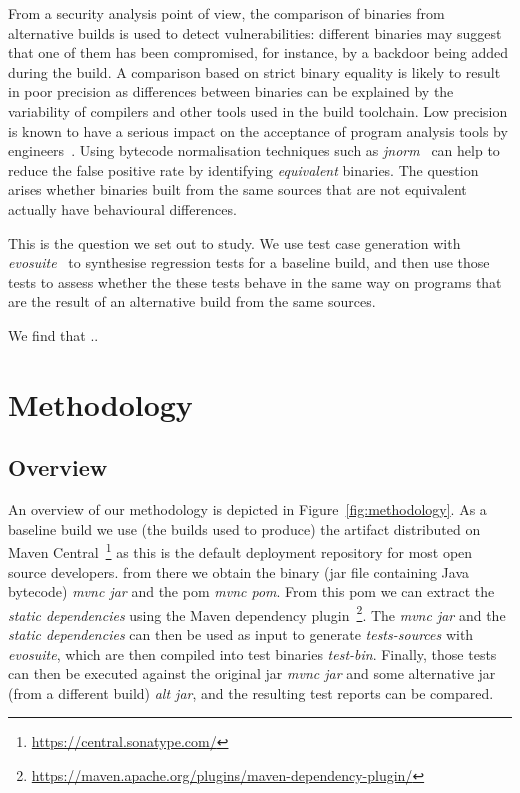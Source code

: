 \documentclass[conference]{IEEEtran}
\begin{document}
From a security analysis point of view, the comparison of binaries from alternative builds is used to detect vulnerabilities: different binaries may suggest that one of them has been compromised, for instance, by a backdoor being added during the build. A comparison based on strict binary equality is likely to result in poor precision as differences between binaries can be explained by the variability of compilers and other tools used in the build toolchain. Low precision is known to have a serious impact on the acceptance of program analysis tools by engineers~\cite{sadowski2018lessons,distefano2019scaling}. Using bytecode normalisation techniques such as \textit{jnorm}~\cite{schott2024JNorm} can help to reduce the false positive rate by identifying \textit{equivalent} binaries. The question arises whether binaries built from the same sources that are not equivalent actually have behavioural differences.   

This is the question we set out to study. We use test case generation with \textit{evosuite}~\cite{fraser2011evosuite} to synthesise regression tests for a baseline build, and then use those tests to assess whether the these tests behave in the same way on programs that are the result of an alternative  build from the same sources. 

We find that .. 


\section{Methodology}



\subsection{Overview}

An overview of our methodology is depicted in Figure~\ref{fig:methodology}.  As a baseline build we use (the builds used to produce) the artifact distributed on Maven Central~\footnote{\url{https://central.sonatype.com/}} as this is the default deployment repository for most open source developers.  from there we obtain the binary (jar file containing Java bytecode) \textit{mvnc jar }and the pom \textit{mvnc pom}. From this pom we can extract the \textit{static dependencies} using the Maven dependency plugin~\footnote{\url{https://maven.apache.org/plugins/maven-dependency-plugin/}}.  The \textit{mvnc jar} and the \textit{static dependencies} can then be used as input to generate \textit{tests-sources} with \textit{evosuite}, which are then compiled into test binaries \textit{test-bin}.  Finally, those tests can then be executed against the original jar \textit{mvnc jar} and some alternative jar (from a different build) \textit{alt jar}, and the resulting test reports can be compared.
\end{document}
